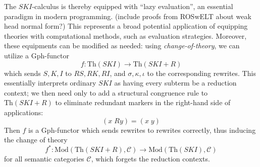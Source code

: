 \documentclass[a4paper,UKenglish]{article}
\theoremstyle{definition}
\newcommand{\Th}{\mathrm{Th}}
\newcommand{\Gph}{\mathrm{Gph}}
\newcommand{\Mod}{\mathrm{Mod}}
\newcommand{\C}{\mathscr{C}}
\begin{document}
The $SKI$-calculus is thereby equipped with ``lazy evaluation'', an essential paradigm in modern programming. (include proofs from ROSwELT about weak head normal form?) This represents a broad potential application of equipping theories with computational methods, such as evaluation strategies. Moreover, these equipments can be modified as needed: using \textit{change-of-theory}, we can utilize a $\Gph$-functor $$f: \Th(SKI) \to \Th(SKI+R)$$ which sends $S,K,I$ to $RS,RK,RI$, and $\sigma, \kappa, \iota$ to the corresponding rewrites. This essentially interprets ordinary $SKI$ as having every subterm be a reduction context; we then need only to add a structural congruence rule to $\Th(SKI+R)$ to eliminate redundant markers in the right-hand side of applications: $$(x\; Ry) = (x\; y)$$ Then $f$ is a $\Gph$-functor which sends rewrites to rewrites correctly, thus inducing the change of theory $$f^*: \Mod(\Th(SKI+R),\C) \to \Mod(\Th(SKI),\C)$$ for all semantic categories $\C$, which forgets the reduction contexts.
\end{document}
